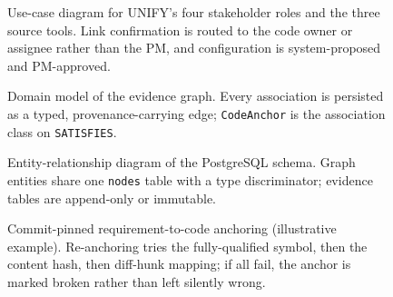 %
%     

\begin{figure}[htbp]
  \centering
  \resizebox{\linewidth}{!}{}
  \caption{Use-case diagram for UNIFY's four stakeholder roles and the three
           source tools. Link confirmation is routed to the code owner or
           assignee rather than the PM, and configuration is system-proposed
           and PM-approved.}
  \label{fig:usecase}
\end{figure}

\begin{landscape}
\begin{figure}[p]
  \centering
  \resizebox{\linewidth}{!}{}
  \caption{Domain model of the evidence graph. Every association is persisted
           as a typed, provenance-carrying edge; \texttt{CodeAnchor} is the
           association class on \texttt{SATISFIES}.}
  \label{fig:domain-model}
\end{figure}
\end{landscape}

\begin{landscape}
\begin{figure}[p]
  \centering
  \resizebox{\linewidth}{!}{}
  \caption{Entity-relationship diagram of the PostgreSQL schema. Graph entities
           share one \texttt{nodes} table with a type discriminator; evidence
           tables are append-only or immutable.}
  \label{fig:erd}
\end{figure}
\end{landscape}

\begin{landscape}
\begin{figure}[p]
  \centering
  \resizebox{\linewidth}{!}{}
  \caption{Commit-pinned requirement-to-code anchoring (illustrative example).
           Re-anchoring tries the fully-qualified symbol, then the content hash,
           then diff-hunk mapping; if all fail, the anchor is marked broken
           rather than left silently wrong.}
  \label{fig:anchor}
\end{figure}
\end{landscape}
